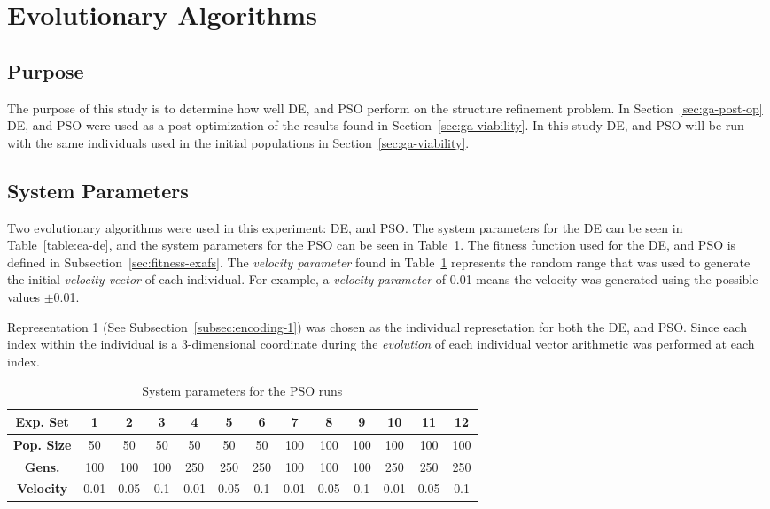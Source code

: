 \section{Evolutionary Algorithms}

\subsection{Purpose}

The purpose of this study is to determine how well DE, and PSO perform on the structure refinement problem. In Section~\ref{sec:ga-post-op} DE, and PSO were used as a post-optimization of the results found in Section~\ref{sec:ga-viability}. In this study DE, and PSO will be run with the same individuals used in the initial populations in Section~\ref{sec:ga-viability}.

\subsection{System Parameters}

Two evolutionary algorithms were used in this experiment: DE, and PSO. The system parameters for the DE can be seen in Table~\ref{table:ea-de}, and the system parameters for the PSO can be seen in Table~\ref{table:ea-pso}. The fitness function used for the DE, and PSO is defined in Subsection~\ref{sec:fitness-exafs}. The \textit{velocity parameter} found in Table~\ref{table:ea-pso} represents the random range that was used to generate the initial \textit{velocity vector} of each individual. For example, a \textit{velocity parameter} of 0.01 means the velocity was generated using the possible values $\pm$0.01.

Representation 1 (See Subsection~\ref{subsec:encoding-1}) was chosen as the individual represetation for both the DE, and PSO. Since each index within the individual is a 3-dimensional coordinate during the \textit{evolution} of each individual vector arithmetic was performed at each index.

\begin{table}
	\centering
	\begin{tabular}{ | >{\bfseries}c | c | c | c | c | c | c | c | c | c | c | c | c | }
		\hline
		Exp. Set & 1 & 2 & 3 & 4 & 5 & 6 & 7 & 8 & 9 & 10 & 11 & 12 \\ \hline
		Pop. Size & 50 & 50 & 50 & 50 & 50 & 50 & 100 & 100 & 100 & 100 & 100 & 100 \\ \hline
		Gens. & 100 & 100 & 100 & 250 & 250 & 250 & 100 & 100 & 100 & 250 & 250 & 250 \\ \hline
		Velocity & 0.01 & 0.05 & 0.1 & 0.01 & 0.05 & 0.1 & 0.01 & 0.05 & 0.1 & 0.01 & 0.05 & 0.1 \\ \hline
	\end{tabular}
	\caption{System parameters for the PSO runs}
	\label{table:ea-pso}
\end{table}

